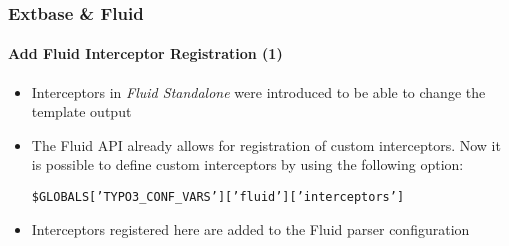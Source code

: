 \begin{frame}[fragile]
	\frametitle{Extbase \& Fluid}
	\framesubtitle{Add Fluid Interceptor Registration (1)}

	\lstset{basicstyle=\tiny\ttfamily}

	\begin{itemize}

		\item Interceptors in \textit{Fluid Standalone} were introduced to be able to change the template output

		\item The Fluid API already allows for registration of custom interceptors.
			Now it is possible to define custom interceptors by using the following option:

			\small
				\texttt{\$GLOBALS['TYPO3\_CONF\_VARS']['fluid']['interceptors']}
			\normalsize

		\item Interceptors registered here are added to the Fluid parser configuration

	\end{itemize}

\end{frame}

